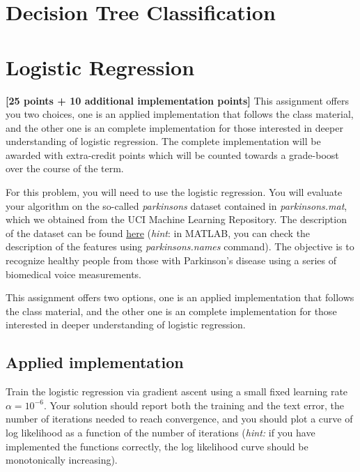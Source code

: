 \documentclass[12pt]{article}
\newenvironment{problem}[2][Problem:]{\begin{trivlist}
\item[\hskip \labelsep {\bfseries #1}\hskip \labelsep {\bfseries #2.}]}{\end{trivlist}}
\begin{document}
\pagebreak


\section{Decision Tree Classification}







\pagebreak

\section{Logistic Regression} 
\textbf{[25 points + 10 additional implementation points]} 
This assignment offers you two choices, one is an applied implementation that follows the class material, and the other one is an complete implementation for those interested in deeper understanding of logistic regression. The complete implementation will be awarded with extra-credit points which will be counted towards a grade-boost over the course of the term. 

For this problem, you will need to use the logistic regression.
You will evaluate your algorithm on the so-called \textit{parkinsons} dataset contained in \textit{parkinsons.mat}, which we
obtained from the UCI Machine Learning Repository. The description of the dataset can be found \href{https://archive.ics.uci.edu/ml/datasets/parkinsons+telemonitoring}{here} (\textit{hint}: in MATLAB, you can check the description of the features using \textit{parkinsons.names} command). The objective is to recognize healthy people from those with Parkinson's disease using a series of biomedical voice measurements.

This assignment offers two options, one is an applied implementation that follows the class material, and the other one is an complete implementation for those interested in deeper understanding of logistic regression. 

\subsection{Applied implementation}
\begin{problem}{Programming: Naive Logistic Regression [13 points]}
Train the logistic regression via gradient ascent using a small fixed learning rate $\alpha = 10^{-6}$. Your solution should report both the training and the text error, the number of iterations needed to reach convergence, and you should plot a curve of log likelihood as a function of the number of iterations (\textit{hint:} if you have implemented the functions correctly, the log likelihood curve should be monotonically increasing).
\end{problem}
\end{document}
